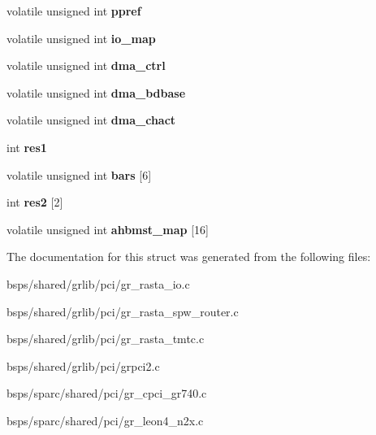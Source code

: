 \begin{DoxyCompactItemize}
volatile unsigned int {\bfseries ppref}
\item 
\mbox{\label{structgrpci2__regs_a38e72c5933ae65d0c1d2614cd874208a}} 
volatile unsigned int {\bfseries io\+\_\+map}
\item 
\mbox{\label{structgrpci2__regs_a547ebdd4042a7d88d8d9f8be6f1036da}} 
volatile unsigned int {\bfseries dma\+\_\+ctrl}
\item 
\mbox{\label{structgrpci2__regs_a43c3559a09891fdb9b1d13c38a26a0c2}} 
volatile unsigned int {\bfseries dma\+\_\+bdbase}
\item 
\mbox{\label{structgrpci2__regs_ab387fd96d8e5de4d1f70e5bf7b74f978}} 
volatile unsigned int {\bfseries dma\+\_\+chact}
\item 
\mbox{\label{structgrpci2__regs_aedf66a8bb3a3e11b7c824bc921e10140}} 
int {\bfseries res1}
\item 
\mbox{\label{structgrpci2__regs_abe8123a2c1a70e6d610bfc1cb287c886}} 
volatile unsigned int {\bfseries bars} \mbox{[}6\mbox{]}
\item 
\mbox{\label{structgrpci2__regs_a39250f78c5b7eb57f8469d8bc39d3ba0}} 
int {\bfseries res2} \mbox{[}2\mbox{]}
\item 
\mbox{\label{structgrpci2__regs_a6fbed411aec99867592ef07fdfff4fca}} 
volatile unsigned int {\bfseries ahbmst\+\_\+map} \mbox{[}16\mbox{]}
\end{DoxyCompactItemize}


The documentation for this struct was generated from the following files\+:\begin{DoxyCompactItemize}
\item 
bsps/shared/grlib/pci/gr\+\_\+rasta\+\_\+io.\+c\item 
bsps/shared/grlib/pci/gr\+\_\+rasta\+\_\+spw\+\_\+router.\+c\item 
bsps/shared/grlib/pci/gr\+\_\+rasta\+\_\+tmtc.\+c\item 
bsps/shared/grlib/pci/grpci2.\+c\item 
bsps/sparc/shared/pci/gr\+\_\+cpci\+\_\+gr740.\+c\item 
bsps/sparc/shared/pci/gr\+\_\+leon4\+\_\+n2x.\+c\end{DoxyCompactItemize}
